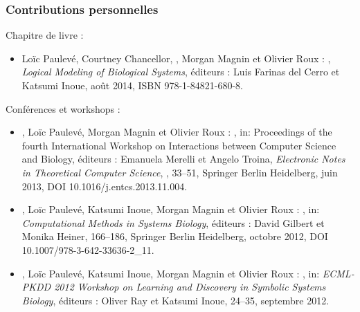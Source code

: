 
\begin{frame}[c]
  \frametitle{Contributions personnelles}

\small
Chapitre de livre :
\begin{itemize}
  \item Loïc Paulevé, Courtney Chancellor, , Morgan Magnin et Olivier Roux :
    ,
    \textit{Logical Modeling of Biological Systems},
    éditeurs : Luis Farinas del Cerro et Katsumi Inoue,
    août 2014, ISBN 978-1-84821-680-8.
\end{itemize}

\medskip
Conférences et workshops :
\begin{itemize}
  \item {}, Loïc Paulevé, Morgan Magnin et Olivier Roux :
    ,
    in: Proceedings of the fourth International Workshop on Interactions between Computer Science and Biology, éditeurs : Emanuela Merelli et Angelo Troina,
    \textit{Electronic Notes in Theoretical Computer Science}, ,
    33--51, Springer Berlin Heidelberg, juin 2013, DOI 10.1016/j.entcs.2013.11.004.
  \item {}, Loïc Paulevé, Katsumi Inoue, Morgan Magnin et Olivier Roux :
    , %
    in: \textit{Computational Methods in Systems Biology}, éditeurs : David Gilbert et Monika Heiner, %
    166--186, Springer Berlin Heidelberg, octobre 2012, DOI 10.1007/978-3-642-33636-2\_11.
  \item {}, Loïc Paulevé, Katsumi Inoue, Morgan Magnin et Olivier Roux :
    ,
    in: \textit{ECML-PKDD 2012 Workshop on Learning and Discovery in Symbolic Systems Biology}, éditeurs : Oliver Ray et Katsumi Inoue,
    24--35, septembre 2012.
\end{itemize}

\end{frame}



